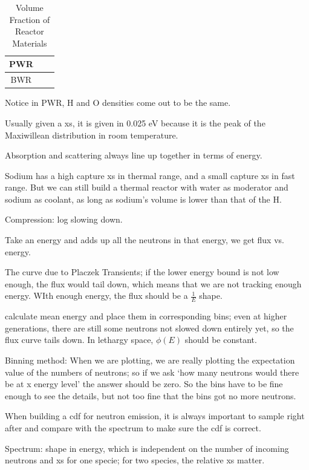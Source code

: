 \documentclass{school-22.211-notes}
\begin{document}
\begin{table}
  \centering
  \begin{tabular}{|c|c|c|} \hline
    PWR & & \\ \hline
    BWR & &  \\ \hline
  \end{tabular}
  \caption{Volume Fraction of Reactor Materials}
\end{table}
Notice in PWR, H and O densities come out to be the same. 

Usually given a xs, it is given in 0.025 eV because it is the peak of the Maxiwillean distribution in room temperature. 

Absorption and scattering always line up together in terms of energy. 

Sodium has a high capture xs in thermal range, and a small capture xs in fast range. But we can still build a thermal reactor with water as moderator and sodium as coolant, as long as sodium's volume is lower than that of the H. 

Compression: log slowing down. 

Take an energy and adds up all the neutrons in that energy, we get flux vs. energy. 

The curve due to Placzek Transients; if the lower energy bound is not low enough, the flux would tail down, which means that we are not tracking enough energy. WIth enough energy, the flux should be a $\frac{1}{E}$ shape. 

 calculate mean energy and place them in corresponding bins; even at higher generations, there are still some neutrons not slowed down entirely yet, so the flux curve tails down. In lethargy space, $\phi(E)$ should be constant. 

Binning method: When we are plotting, we are really plotting the expectation value of the numbers of neutrons; so if we ask `how many neutrons would there be at x energy level' the answer should be zero. So the bins have to be fine enough to see the details, but not too fine that the bins got no more neutrons. 


When building a cdf for neutron emission, it is always important to sample right after and compare with the spectrum to make sure the cdf is correct. 

Spectrum: shape in energy, which is independent on the number of incoming neutrons and xs for one specie; for two species, the relative xs matter. 
\end{document}
